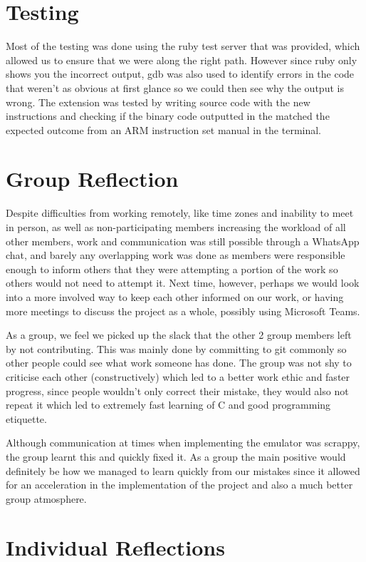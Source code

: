 \documentclass{article}
\begin{document}
\section*{Testing}
Most of the testing was done using the ruby test server that was provided, which allowed us to ensure that we were along the right path. However since ruby only shows you the incorrect output, gdb was also used to identify errors in the code that weren't as obvious at first glance so we could then see why the output is wrong. 
The extension was tested by writing source code with the new instructions and checking if the binary code outputted in the matched the expected outcome from an ARM instruction set manual in the terminal.

\section*{Group Reflection}
Despite difficulties from working remotely, like time zones and inability to meet in person, as well as non-participating members increasing the workload of all other members, work and communication was still possible through a WhatsApp chat, and barely any overlapping work was done as members were responsible enough to inform others that they were attempting a portion of the work so others would not need to attempt it. Next time, however, perhaps we would look into a more involved way to keep each other informed on our work, or having more meetings to discuss the project as a whole, possibly using Microsoft Teams.

As a group, we feel we picked up the slack that the other 2 group members left by not contributing. This was mainly done by committing to git commonly so other people could see what work someone has done. The group was not shy to criticise each other (constructively) which led to a better work ethic and faster progress, since people wouldn't only correct their mistake, they would also not repeat it which led to extremely fast learning of C and good programming etiquette.

Although communication at times when implementing the emulator was scrappy, the group learnt this and quickly fixed it. As a group the main positive would definitely be how we managed to learn quickly from our mistakes since it allowed for an acceleration in the implementation of the project and also a much better group atmosphere.

\section*{Individual Reflections}
\end{document}
